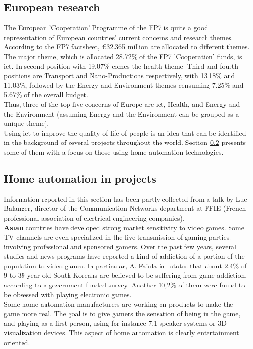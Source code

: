 \subsection{European research}
The European 'Cooperation' Programme of the FP7 is quite a good representation of European countries' current concerns and research themes. According to the FP7 factsheet\cite{fp7-factsheets}, €32.365 million are allocated to different themes. The major theme, which is allocated 28.72\% of the FP7 'Cooperation' funds, is \gls{ict}. In second position with 19.07\% comes the health theme. Third and fourth positions are Transport and Nano-Productions respectively, with 13.18\% and 11.03\%, followed by the Energy and Environment themes consuming 7.25\% and 5.67\% of the overall budget.\\
Thus, three of the top five concerns of Europe are \gls{ict}, Health, and Energy and the Environment (assuming Energy and the Environment can be grouped as a unique theme).\\

Using \gls{ict} to improve the quality of life of people is an idea that can be identified in the background of several projects throughout the world. Section~\ref{sec:homeautomation.projects} presents some of them with a focus on those using home automation technologies.

\subsection{Home automation in projects}
\label{sec:homeautomation.projects}

Information reported in this section has been partly collected from a talk by Luc Balanger, director of the Communication Networks department at FFIE (French professional association of electrical engineering companies).\\

{\bf Asian} countries have developed strong market sensitivity to video games. Some TV channels are even specialized in the live transmission of gaming parties, involving professional and sponsored gamers. Over the past few years, several studies and news programs have reported a kind of addiction of a portion of the  population to video games. In particular, A. Faiola in~\cite{Faiola:2006} states that about 2.4\% of 9 to 39 year-old South Koreans are believed to be suffering from game addiction, according to a government-funded survey. Another 10,2\% of them were found to be obsessed with playing electronic games.\\
Some home automation manufacturers are working on products to make the game more real. The goal is to give gamers the sensation of being in the game, and playing as a first person, using for instance 7.1 speaker systems or 3D visualization devices. This aspect of home automation is clearly entertainment oriented.\\

